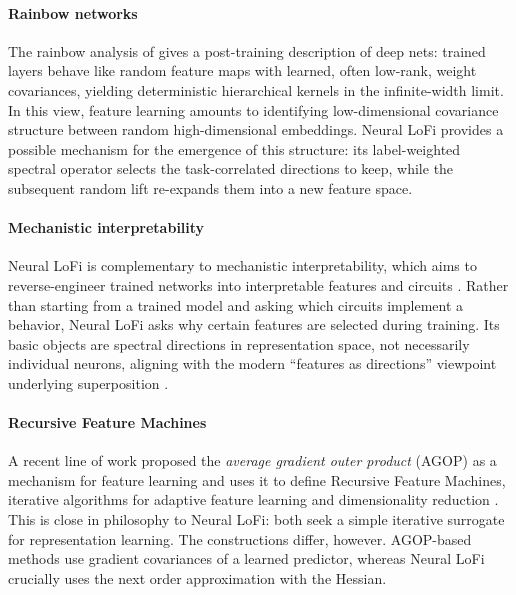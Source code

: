 \paragraph{Rainbow networks}
The rainbow analysis  of \cite{guth2024rainbow} gives a post-training description of deep nets: trained layers behave like random feature maps with learned, often low-rank, weight covariances, yielding deterministic hierarchical kernels in the infinite-width limit. In this view, feature learning amounts to identifying low-dimensional covariance structure between random high-dimensional embeddings. Neural LoFi provides a possible mechanism for the emergence of this structure: its label-weighted spectral operator selects the task-correlated directions to keep, while the subsequent random lift re-expands them into a new feature space. 

\paragraph{Mechanistic interpretability}
Neural LoFi is complementary to mechanistic interpretability, which aims to reverse-engineer trained networks into interpretable features and circuits \cite{olah2020zoom,elhage2021mathematical}. Rather than starting from a trained model and asking which circuits implement a behavior, Neural LoFi asks why certain features are selected during training. Its basic objects are spectral directions in representation space, not necessarily individual neurons, aligning with the modern ``features as directions'' viewpoint underlying superposition \cite{elhage2022toy}.




\paragraph{Recursive Feature Machines} A recent line of work proposed the \emph{average gradient outer product} (AGOP) as a mechanism for feature learning and uses it to define Recursive Feature Machines, iterative algorithms for adaptive feature learning and dimensionality reduction \cite{radhakrishnan2024mechanism,radhakrishnan2025linear}. This is close in philosophy to Neural LoFi: both seek a simple iterative surrogate for representation learning. The constructions differ, however. AGOP-based methods use gradient covariances of a learned predictor, whereas Neural LoFi crucially uses the next order approximation with the Hessian.

